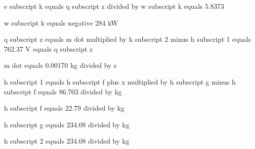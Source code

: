 e subscript k equals q subscript z divided by w subscript k equals 5.8373  

w subscript k equals negative 284 kW  

q subscript z equals m dot multiplied by h subscript 2 minus h subscript 1 equals 762.37 V equals q subscript z  

m dot equals 0.00170 kg divided by s  

h subscript 1 equals h subscript f plus x multiplied by h subscript g minus h subscript f equals 86.703 divided by kg  

h subscript f equals 22.79 divided by kg  

h subscript g equals 234.08 divided by kg  

h subscript 2 equals 234.08 divided by kg